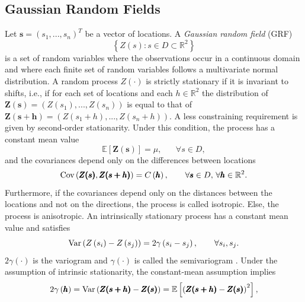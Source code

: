 \subsection{Gaussian Random Fields}
Let $\pmb{s} = \left(s_1,...,s_n\right)^T$ be a vector of locations. A \textit{Gaussian random field} (GRF)
\begin{equation}
    \left\lbrace Z(s):s\in D\subset\mathbb{R}^2\right\rbrace
\end{equation}
is a set of random variables where the observations occur in a continuous domain and where each finite set of random variables follows a multivariate normal distribution. A random process $Z\left(\cdot\right)$ is strictly stationary if it is invariant to shifts, i.e., if for each set of locations and each $h\in\mathbb{R}^2$ the distribution of $\pmb{Z(s)}=\left(Z\left(s_1\right),... ,Z\left(s_n\right)\right)$ is equal to that of $\pmb{Z(s+h)}=\left(Z\left(s_1+h\right),...,Z\left(s_n+h\right)\right)$. A less constraining requirement is given by second-order stationarity. Under this condition, the process has a constant mean value
\begin{equation}
    \mathbb{E}\left[\pmb{Z(s)}\right] = \mu, \hspace{20pt}\forall s\in D,
\end{equation}
and the covariances depend only on the differences between locations
\begin{equation}
    \hbox{Cov}\left(\pmb{Z(s)}, \pmb{Z(s+h)}\right)=C\left(\pmb{h}\right), \hspace{20pt}\forall \pmb{s}\in D,\,\forall \pmb{h}\in\mathbb{R}^2.
\end{equation}
Furthermore, if the covariances depend only on the distances between the locations and not on the directions, the process is called isotropic. Else, the process is anisotropic. An intrinsically stationary process has a constant mean value and satisfies
\begin{equation}
    \hbox{Var}\left(Z\left(s_i\right)-Z\left(s_j\right)\right)=2\gamma\left(s_i-s_j\right),\hspace{20pt}\forall s_i,s_j.
\end{equation}
$2\gamma\left(\cdot\right)$ is the variogram and $\gamma\left(\cdot\right)$ is called the semivariogram \autocite[][]{cressie2015statistics}. Under the assumption of intrinsic stationarity, the constant-mean assumption implies
\begin{equation*}
    2\gamma\left(\pmb{h}\right)=\hbox{Var}\left(\pmb{Z(s+h)}-\pmb{Z(s)}\right)=\mathbb{E}\left[\left(\pmb{Z(s+h)}-\pmb{Z(s)}\right)^2\right],
\end{equation*}
